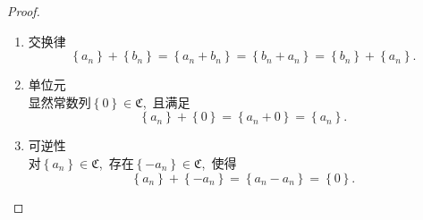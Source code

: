 \documentclass[UTF8, twoside]{ctexart}
\theoremstyle{nonumberplain}
\newtheorem{proof}{\heiti 证明}  %
\theoremstyle{nonumberplain}
\theoremstyle{plain}
\begin{document}
\begin{proof}
\begin{enumerate}
\begin{enumerate}
				\item 交换律
				\[
				\left\{ {{a}_{n}} \right\}+\left\{ {{b}_{n}} \right\}=\left\{ {{a}_{n}}+{{b}_{n}} \right\}=\left\{ {{b}_{n}}+{{a}_{n}} \right\}=\left\{ {{b}_{n}} \right\}+\left\{ {{a}_{n}} \right\}.
				\]
				\vskip 0.3cm
				
				\item 单位元 \\
				显然常数列$\left\{ 0 \right\}\in \mathfrak{C}$,\ 且满足
				\[
				\left\{ {{a}_{n}} \right\}+\left\{ 0 \right\}=\left\{ {{a}_{n}}+0 \right\}=\left\{ {{a}_{n}} \right\}.
				\]
				\vskip 0.3cm
				
				\item 可逆性 \\
				对$\left\{ {{a}_{n}} \right\}\in \mathfrak{C}$,\ 存在$\left\{ -{{a}_{n}} \right\}\in \mathfrak{C}$,\ 使得
				\[
				\left\{ {{a}_{n}} \right\}+\left\{ -{{a}_{n}} \right\}=\left\{ {{a}_{n}}-{{a}_{n}} \right\}=\left\{ 0 \right\}.
				\]
			\end{enumerate}
			\vskip 0.3cm
			

\end{enumerate}
\end{proof}
\end{document}
